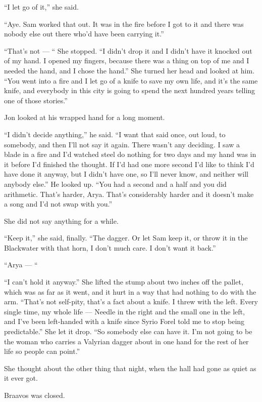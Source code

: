 “I let go of it,” she said.

“Aye. Sam worked that out. It was in the fire before I got to it and there was nobody else out there who’d have been carrying it.”

“That’s not — “ She stopped. “I didn’t drop it and I didn’t have it knocked out of my hand. I opened my fingers, because there was a thing on top of me and I needed the hand, and I chose the hand.” She turned her head and looked at him. “You went into a fire and I let go of a knife to save my own life, and it’s the same knife, and everybody in this city is going to spend the next hundred years telling one of those stories.”

Jon looked at his wrapped hand for a long moment.

“I didn’t decide anything,” he said. “I want that said once, out loud, to somebody, and then I’ll not say it again. There wasn’t any deciding. I saw a blade in a fire and I’d watched steel do nothing for two days and my hand was in it before I’d finished the thought. If I’d had one more second I’d like to think I’d have done it anyway, but I didn’t have one, so I’ll never know, and neither will anybody else.” He looked up. “You had a second and a half and you did arithmetic. That’s harder, Arya. That’s considerably harder and it doesn’t make a song and I’d not swap with you.”

She did not say anything for a while.

“Keep it,” she said, finally. “The dagger. Or let Sam keep it, or throw it in the Blackwater with that horn, I don’t much care. I don’t want it back.”

“Arya — “

“I can’t hold it anyway.” She lifted the stump about two inches off the pallet, which was as far as it went, and it hurt in a way that had nothing to do with the arm. “That’s not self-pity, that’s a fact about a knife. I threw with the left. Every single time, my whole life — Needle in the right and the small one in the left, and I’ve been left-handed with a knife since Syrio Forel told me to stop being predictable.” She let it drop. “So somebody else can have it. I’m not going to be the woman who carries a Valyrian dagger about in one hand for the rest of her life so people can point.”

\sceneBreak

She thought about the other thing that night, when the hall had gone as quiet as it ever got.

Braavos was closed.

